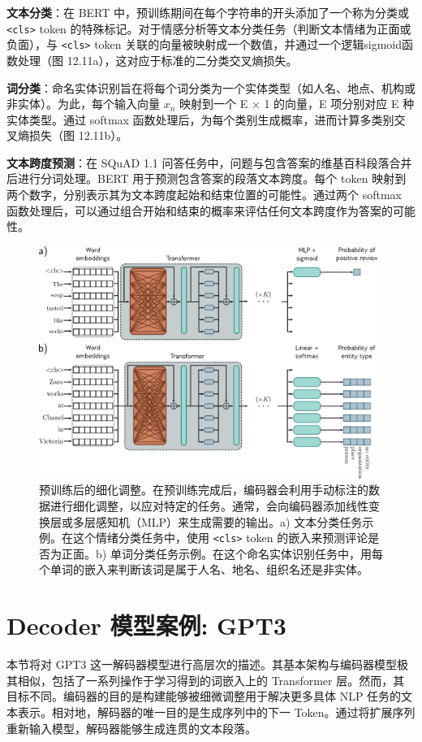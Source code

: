 \textbf{文本分类}：在 BERT 中，预训练期间在每个字符串的开头添加了一个称为分类或 \texttt{\textless cls\textgreater} token 的特殊标记。对于情感分析等文本分类任务（判断文本情绪为正面或负面），与 \texttt{\textless cls\textgreater} token 关联的向量被映射成一个数值，并通过一个逻辑sigmoid函数处理（图 12.11a），这对应于标准的二分类交叉熵损失。

\textbf{词分类}：命名实体识别旨在将每个词分类为一个实体类型（如人名、地点、机构或非实体）。为此，每个输入向量 \(x_n\) 映射到一个 E × 1 的向量，E 项分别对应 E 种实体类型。通过 softmax 函数处理后，为每个类别生成概率，进而计算多类别交叉熵损失（图 12.11b）。

\textbf{文本跨度预测}：在 SQuAD 1.1 问答任务中，问题与包含答案的维基百科段落合并后进行分词处理。BERT 用于预测包含答案的段落文本跨度。每个 token 映射到两个数字，分别表示其为文本跨度起始和结束位置的可能性。通过两个 softmax 函数处理后，可以通过组合开始和结束的概率来评估任何文本跨度作为答案的可能性。

\begin{figure}[ht!]
\centering
\includegraphics[width=0.7\linewidth]{png/chapter12/TransformerEncoderFineTune.png}
\caption{预训练后的细化调整。在预训练完成后，编码器会利用手动标注的数据进行细化调整，以应对特定的任务。通常，会向编码器添加线性变换层或多层感知机（MLP）来生成需要的输出。a) 文本分类任务示例。在这个情绪分类任务中，使用 \texttt{\textless cls\textgreater} token 的嵌入来预测评论是否为正面。b) 单词分类任务示例。在这个命名实体识别任务中，用每个单词的嵌入来判断该词是属于人名、地名、组织名还是非实体。}
\end{figure}


\section{Decoder 模型案例: GPT3}
本节将对 GPT3 这一解码器模型进行高层次的描述。其基本架构与编码器模型极其相似，包括了一系列操作于学习得到的词嵌入上的 Transformer 层。然而，其目标不同。编码器的目的是构建能够被细微调整用于解决更多具体 NLP 任务的文本表示。相对地，解码器的唯一目的是生成序列中的下一 Token。通过将扩展序列重新输入模型，解码器能够生成连贯的文本段落。

